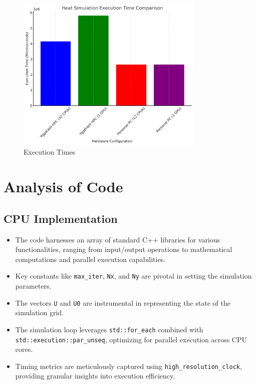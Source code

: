 \documentclass[11pt]{article}
\begin{document}
    \begin{figure}[ht]
    \centering
    \includegraphics[width=0.8\textwidth]{img/execution_time.png}
    \caption{Execution Times}
    \end{figure}

    \hypertarget{analysis-of-code}{%
    \section{Analysis of Code}\label{analysis-of-code}}

    \hypertarget{cpu-implementation}{%
    \subsection{CPU Implementation}\label{cpu-implementation}}

    \begin{itemize}
    
    \item
    The code harnesses an array of standard C++ libraries for various
    functionalities, ranging from input/output operations to mathematical
    computations and parallel execution capabilities.
    \item
    Key constants like \texttt{max\_iter}, \texttt{Nx}, and \texttt{Ny}
    are pivotal in setting the simulation parameters.
    \item
    The vectors \texttt{U} and \texttt{U0} are instrumental in
    representing the state of the simulation grid.
    \item
    The simulation loop leverages \texttt{std::for\_each} combined with
    \texttt{std::execution::par\_unseq}, optimizing for parallel execution
    across CPU cores.
    \item
    Timing metrics are meticulously captured using
    \texttt{high\_resolution\_clock}, providing granular insights into
    execution efficiency.
    \end{itemize}
\end{document}

